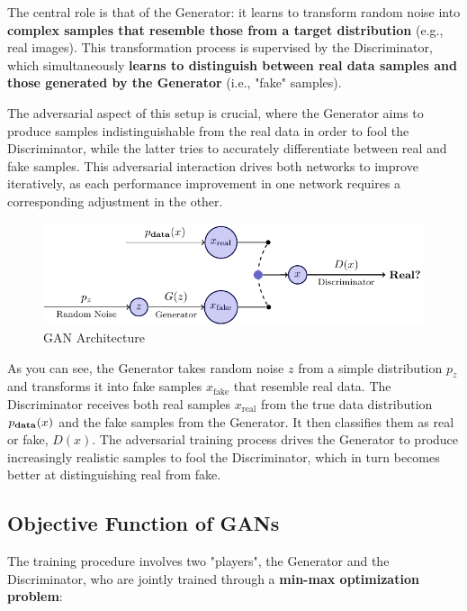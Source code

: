 The central role is that of the Generator: it learns to transform random noise into \textbf{complex samples that resemble those from a target distribution} (e.g., real images). This transformation process is supervised by the Discriminator, which simultaneously \textbf{learns to distinguish between real data samples and those generated by the Generator} (i.e., "fake" samples).

The adversarial aspect of this setup is crucial, where the Generator aims to produce samples indistinguishable from the real data in order to fool the Discriminator, while the latter tries to accurately differentiate between real and fake samples. This adversarial interaction drives both networks to improve iteratively, as each performance improvement in one network requires a corresponding adjustment in the other.

\newpage
\begin{figure}[!htbp]
    \centering
    \includegraphics[width=\linewidth]{tikz/chapter9 - Generative Adversarial Network.pdf}
    \caption{GAN Architecture}
\end{figure}

As you can see, the Generator takes random noise \(z\) from a simple distribution \(p_z\) and transforms it into fake samples \( x_{\text{fake}} \) that resemble real data. The Discriminator receives both real samples \( x_{\text{real}} \) from the true data distribution \( p_{\text{\textbf{data}}}(x) \) and the fake samples from the Generator. It then classifies them as real or fake, \( D(x) \). The adversarial training process drives the Generator to produce increasingly realistic samples to fool the Discriminator, which in turn becomes better at distinguishing real from fake.

\subsection{Objective Function of GANs}

The training procedure involves two "players", the Generator and the Discriminator, who are jointly trained through a \textbf{min-max optimization problem}:

